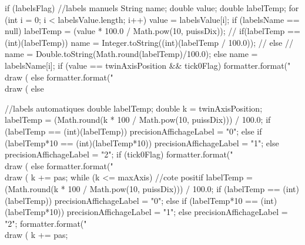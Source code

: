 \begin{code}
\begin{hide}
{{         if (labelsFlag) {   //labels manuels
            String name;
            double value;
            double labelTemp;
            for (int i = 0; i < labelsValue.length; i++) {
               value = labelsValue[i];
               if (labelsName == null) {
                  labelTemp = (value * 100.0 / Math.pow(10, puissDix));
                  //                   if(labelTemp == (int)(labelTemp))
                  name = Integer.toString((int)(labelTemp / 100.0));
                  //                   else
                  //                      name = Double.toString(Math.round(labelTemp)/100.0);
               } else
                  name = labelsName[i];
               if (value == twinAxisPosition && tick0Flag)
                  formatter.format("\\draw (%
               else
                  formatter.format("\\draw (%
            }
         } else {   //labels automatiques
            double labelTemp;
            double k = twinAxisPosition;
            labelTemp = (Math.round(k * 100 / Math.pow(10, puissDix))) / 100.0;
            if (labelTemp == (int)(labelTemp))
               precisionAffichageLabel = "0";
            else if (labelTemp*10 == (int)(labelTemp*10))
               precisionAffichageLabel = "1";
            else
               precisionAffichageLabel = "2";
            if (tick0Flag)
               formatter.format("\\draw (%
            else
               formatter.format("\\draw (%
            k += pas;
            while (k <= maxAxis) { //cote positif
               labelTemp = (Math.round(k * 100 / Math.pow(10, puissDix))) / 100.0;
               if (labelTemp == (int)(labelTemp))
                  precisionAffichageLabel = "0";
               else if (labelTemp*10 == (int)(labelTemp*10))
                  precisionAffichageLabel = "1";
               else
                  precisionAffichageLabel = "2";
               formatter.format("\\draw (%
               k += pas;
            }

}}}
\end{hide}
\end{code}
